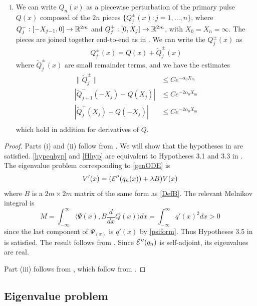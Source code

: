 \documentclass[thesis.tex]{subfiles}
\begin{document}
\begin{theorem}
\begin{enumerate}[(i)]
\item We can write $Q_n(x)$ as a piecewise perturbation of the primary pulse $Q(x)$ composed of the $2n$ pieces $\{ Q_j^\pm(x) : j = 1, \dots, n \}$, where $Q_j^-: [-X_{j-1}, 0] \rightarrow \mathbb{R}^{2m}$ and $Q_j^+: [0, X_j] \rightarrow \mathbb{R}^{2m}$, with $X_0 = X_n = \infty$. The pieces are joined together end-to-end as in \cite{Sandstede1998}. We can write the $Q_j^\pm(x)$ as 
\begin{equation}\label{Qpmexpansions}
Q_j^\pm(x) = Q(x) + \tilde{Q}_j^\pm(x)
\end{equation}
where $\tilde{Q}_j^\pm(x)$ are small remainder terms, and we have the estimates
\begin{equation}
\begin{aligned}
\|\tilde{Q}_j^\pm\| &\leq C e^{-\alpha_0 X_m} \\
|\tilde{Q}_{j+1}^-(-X_j) - Q(X_j)| &\leq C e^{-2 \alpha_0 X_m} \\
|\tilde{Q}_j^+(X_j) - Q(-X_j)| &\leq C e^{-2 \alpha_0 X_m} \\
\end{aligned}
\end{equation}
which hold in addition for derivatives of $Q$.
\end{enumerate}
\begin{proof}
Parts (i) and (ii) follow from \cite{SandstedeStrut}. We will show that the hypotheses in \cite{SandstedeStrut} are satisfied. \cref{hypeqhyp} and \cref{Hhyp} are equivalent to Hypotheses 3.1 and 3.3 in \cite{SandstedeStrut}. The eigenvalue problem corresponding to \cref{genODE} is
\[
V'(x) = (\mathcal{E}''(q_n(x)) + \lambda B )V(x)
\]
where $B$ is a $2m\times 2m$ matrix of the same form as \cref{DefB}. The relevant Melnikov integral is
\[
M = \int_{-\infty}^\infty \langle \Psi(x), B \frac{d}{dx} Q(x) \rangle  dx = \int_{-\infty}^\infty q'(x)^2 dx > 0
\]
since the last component of $\Psi_(x)$ is $q'(x)$ by \cref{psiform}. Thus Hypotheses 3.5 in \cite{SandstedeStrut} is satisfied. The result follows from \cite[Theorem 3.6]{SandstedeStrut}. Since $\mathcal{E}''(q_n)$ is self-adjoint, its eigenvalues are real.

Part (iii) follows from \cite[Theorem 2]{Sandstede1998}, which follow from \cite{Sandstede1993}.
\end{proof}
\end{theorem}

\subsection{Eigenvalue problem}\label{sec:multispecR}
\end{document}
